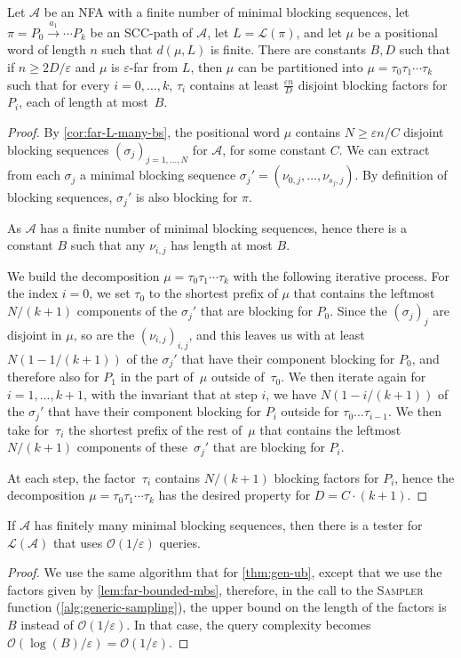\documentclass[letterpaper, USenglish, cleveref, autoref, thm-restate, numberwithinsect]{lipics-v2021}
\theoremstyle{theorem}
\theoremstyle{definition}
\newcommand{\Aa}{\mathcal{A}}
\newcommand{\cO}{\mathcal{O}}
\newcommand{\eps}{\varepsilon}
\newcommand{\lang}[1]{\mathcal{L}(#1)}
\newcommand{\SCCpath}{\pi}
\begin{document}
\begin{lemma}\label{lem:far-bounded-mbs}
	Let $\Aa$ be an NFA with a finite number of minimal blocking sequences,
    let~$\SCCpath  = P_0 \xrightarrow{a_1} \cdots  P_k$ be an SCC-path of $\Aa$, let $L = \lang{\SCCpath}$, and let $\mu$ be a positional word of length $n$ such that $d(\mu, L)$ is finite.
    There are constants $B, D$ such that if $n \geq 2D/\eps$
    and $\mu$ is $\eps$-far from $L$, then $\mu$ can be partitioned into $\mu = \tau_0\tau_1\cdots\tau_k$ such that for every $i = 0,\ldots, k$,
    $\tau_i$ contains at least $\frac{\eps n}{D}$ disjoint blocking factors for~$P_i$, each of length at most~$B$.
\end{lemma}
\begin{proof}
	By \cref{cor:far-L-many-bs}, the positional word $\mu$ contains $N \ge \eps n/C$ disjoint blocking sequences $(\sigma_j)_{j=1,\ldots, N}$ for $\Aa$, for some constant $C$.
	We can extract from each $\sigma_j$ a minimal blocking sequence $\sigma_j' = (\nu_{0,j},\ldots, \nu_{s_j, j})$.
	By definition of blocking sequences, $\sigma_j'$ is also blocking for  $\SCCpath$.
	
	As $\Aa$ has a finite number of minimal blocking sequences, hence there is a constant $B$ such that any $\nu_{i,j}$ has length at most $B$.

	We build the decomposition $\mu = \tau_0\tau_1\cdots\tau_k$ with the following iterative process.
	For the index $i = 0$, we set $\tau_0$ to the shortest prefix of $\mu$ that contains the leftmost $N/(k+1)$ components of the $\sigma_j'$ that are blocking for $P_0$.
	Since the $(\sigma_j)_j$ are disjoint in $\mu$, so are the $(\nu_{i,j})_{i,j}$, and this leaves us with at least $N(1-1/(k+1))$ of the $\sigma_j'$ that have their component blocking for $P_0$, and therefore also for $P_1$ in the part of~$\mu$ outside of~$\tau_0$.
	We then iterate again for $i=1,\ldots, k+1$, with the invariant that at step $i$, we have $N(1-i/(k+1))$ of the $\sigma_j'$ that have their component blocking for $P_i$ outside for $\tau_0\ldots\tau_{i-1}$. We then take for~$\tau_i$ the shortest prefix of the rest of~$\mu$ that contains the leftmost $N/(k+1)$ components of these~$\sigma_j'$ that are blocking for $P_i$.

	At each step, the factor~$\tau_i$ contains $N/(k+1)$ blocking factors for $P_i$, hence the decomposition $\mu = \tau_0\tau_1\cdots\tau_k$ has the desired property for $D = C\cdot (k+1)$.
\end{proof}

\begin{proposition}
	\label{coro:fin-bs-then-easy}
	If $\Aa$ has finitely many minimal blocking sequences, then there is a tester for $\lang{\Aa}$ that uses $\cO(1/\eps)$ queries.
\end{proposition}
\begin{proof}
	We use the same algorithm that for \cref{thm:gen-ub}, except that we use the factors given by \cref{lem:far-bounded-mbs}, therefore, in the call to the \textsc{Sampler} function (\cref{alg:generic-sampling}), the upper bound on the length of the factors is~$B$ instead of $\cO(1/\eps)$.
	In that case, the query complexity becomes $\cO(\log(B)/\eps) = \cO(1/\eps)$.
\end{proof}
\end{document}
